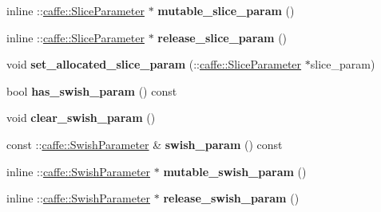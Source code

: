 \begin{DoxyCompactItemize}
inline \+::\mbox{\hyperlink{classcaffe_1_1_slice_parameter}{caffe\+::\+Slice\+Parameter}} $\ast$ {\bfseries mutable\+\_\+slice\+\_\+param} ()
\item 
\mbox{\label{classcaffe_1_1_layer_parameter_a9655d54fa9a774431c749e812c47d4a9}} 
inline \+::\mbox{\hyperlink{classcaffe_1_1_slice_parameter}{caffe\+::\+Slice\+Parameter}} $\ast$ {\bfseries release\+\_\+slice\+\_\+param} ()
\item 
\mbox{\label{classcaffe_1_1_layer_parameter_ab8cacd8082f549af7a5811feb348bddb}} 
void {\bfseries set\+\_\+allocated\+\_\+slice\+\_\+param} (\+::\mbox{\hyperlink{classcaffe_1_1_slice_parameter}{caffe\+::\+Slice\+Parameter}} $\ast$slice\+\_\+param)
\item 
\mbox{\label{classcaffe_1_1_layer_parameter_ad8e261997278055c446b27661b2021d0}} 
bool {\bfseries has\+\_\+swish\+\_\+param} () const
\item 
\mbox{\label{classcaffe_1_1_layer_parameter_a02a951bce0c33db2eb964d6c1819becd}} 
void {\bfseries clear\+\_\+swish\+\_\+param} ()
\item 
\mbox{\label{classcaffe_1_1_layer_parameter_a434486fe4b84ca847f39f37afa4e76c8}} 
const \+::\mbox{\hyperlink{classcaffe_1_1_swish_parameter}{caffe\+::\+Swish\+Parameter}} \& {\bfseries swish\+\_\+param} () const
\item 
\mbox{\label{classcaffe_1_1_layer_parameter_a732392f0a043315876d9467b14475983}} 
inline \+::\mbox{\hyperlink{classcaffe_1_1_swish_parameter}{caffe\+::\+Swish\+Parameter}} $\ast$ {\bfseries mutable\+\_\+swish\+\_\+param} ()
\item 
\mbox{\label{classcaffe_1_1_layer_parameter_af0438fad4091d5d65f1224f947a03b26}} 
inline \+::\mbox{\hyperlink{classcaffe_1_1_swish_parameter}{caffe\+::\+Swish\+Parameter}} $\ast$ {\bfseries release\+\_\+swish\+\_\+param} ()
\item 
\mbox{\label{classcaffe_1_1_layer_parameter_a55e400176ccf3830ead409db9bac7aa1}} 

\end{DoxyCompactItemize}
